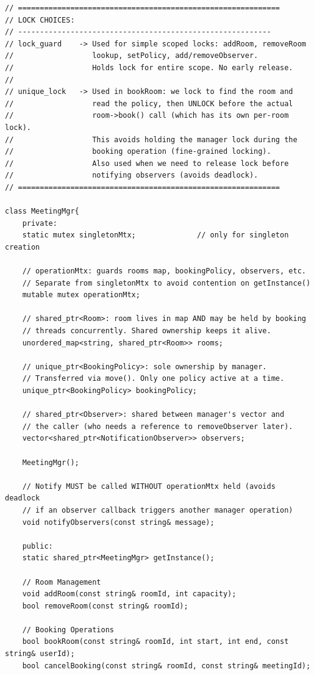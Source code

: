 \documentclass[11pt,a4paper]{article}
\begin{document}
\begin{lstlisting}[title={\texttt{managers.hpp}}]
// ============================================================
// LOCK CHOICES:
// ----------------------------------------------------------
// lock_guard    -> Used for simple scoped locks: addRoom, removeRoom
//                  lookup, setPolicy, add/removeObserver.
//                  Holds lock for entire scope. No early release.
//
// unique_lock   -> Used in bookRoom: we lock to find the room and
//                  read the policy, then UNLOCK before the actual
//                  room->book() call (which has its own per-room lock).
//                  This avoids holding the manager lock during the
//                  booking operation (fine-grained locking).
//                  Also used when we need to release lock before
//                  notifying observers (avoids deadlock).
// ============================================================

class MeetingMgr{
    private:
    static mutex singletonMtx;              // only for singleton creation

    // operationMtx: guards rooms map, bookingPolicy, observers, etc.
    // Separate from singletonMtx to avoid contention on getInstance()
    mutable mutex operationMtx;

    // shared_ptr<Room>: room lives in map AND may be held by booking
    // threads concurrently. Shared ownership keeps it alive.
    unordered_map<string, shared_ptr<Room>> rooms;
    
    // unique_ptr<BookingPolicy>: sole ownership by manager.
    // Transferred via move(). Only one policy active at a time.
    unique_ptr<BookingPolicy> bookingPolicy;
    
    // shared_ptr<Observer>: shared between manager's vector and
    // the caller (who needs a reference to removeObserver later).
    vector<shared_ptr<NotificationObserver>> observers;

    MeetingMgr();

    // Notify MUST be called WITHOUT operationMtx held (avoids deadlock
    // if an observer callback triggers another manager operation)
    void notifyObservers(const string& message);

    public:
    static shared_ptr<MeetingMgr> getInstance();
    
    // Room Management
    void addRoom(const string& roomId, int capacity);
    bool removeRoom(const string& roomId);
    
    // Booking Operations
    bool bookRoom(const string& roomId, int start, int end, const string& userId);
    bool cancelBooking(const string& roomId, const string& meetingId);
    

\end{lstlisting}
\end{document}
